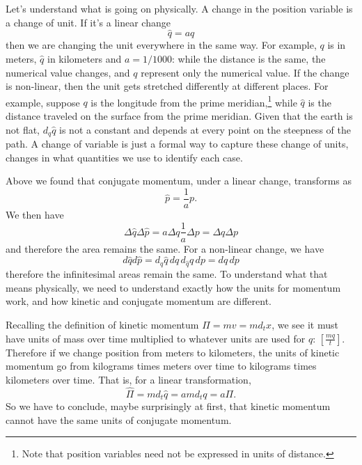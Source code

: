 Let's understand what is going on physically. A change in the position variable is a change of unit. If it's a linear change
\begin{equation}
	\hat{q} = a q
\end{equation}
then we are changing the unit everywhere in the same way. For example, $q$ is in meters, $\hat{q}$ in kilometers and $a = 1/1000$: while the distance is the same, the numerical value changes, and $q$ represent only the numerical value. If the change is non-linear, then the unit gets stretched differently at different places. For example, suppose $q$ is the longitude from the prime meridian,\footnote{Note that position variables need not be expressed in units of distance.} while $\hat{q}$ is the distance traveled on the surface from the prime meridian. Given that the earth is not flat, $d_q \hat{q}$ is not a constant and depends at every point on the steepness of the path. A change of variable is just a formal way to capture these change of units, changes in what quantities we use to identify each case.

Above we found that conjugate momentum, under a linear change, transforms as
\begin{equation}
	\hat{p} = \frac{1}{a} p.
\end{equation}
We then have
\begin{equation}
	\Delta \hat{q} \Delta \hat{p} = a \Delta q \frac{1}{a} \Delta p = \Delta q \Delta p
\end{equation}
and therefore the area remains the same. For a non-linear change, we have
\begin{equation}
	d \hat{q} d \hat{p} = d_q \hat{q} \, dq \, d_{\hat{q}} q \, dp = dq \, dp
\end{equation}
therefore the infinitesimal areas remain the same. To understand what that means physically, we need to understand exactly how the units for momentum work, and how kinetic and conjugate momentum are different.

Recalling the definition of kinetic momentum $\Pi = mv = m d_t x$, we see it must have units of mass over time multiplied to whatever units are used for $q$: $\left[ \frac{m q}{t} \right]$. Therefore if we change position from meters to kilometers, the units of kinetic momentum go from kilograms times meters over time to kilograms times kilometers over time. That is, for a linear transformation,
\begin{equation}
	\hat{\Pi} = m d_t \hat{q} = a m d_t q  = a \Pi.
\end{equation}
So we have to conclude, maybe surprisingly at first, that kinetic momentum cannot have the same units of conjugate momentum.

